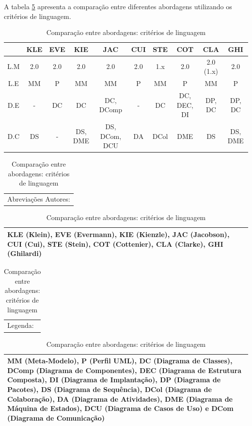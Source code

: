 A tabela \ref{tab:comparison_table_language} apresenta a comparação entre diferentes abordagens utilizando os critérios de linguagem.

\begin{table}[h]
	\centering
	\begin{tabular}{ | c | c | c | c | c | c | c | c | c | c | }
		\hline
		 & KLE & EVE & KIE & JAC & CUI & STE & COT & CLA & GHI \\
		\hline
		 L.M & 2.0 & 2.0 & 2.0 & 2.0 & 2.0 & 1.x & 2.0 & 2.0 (1.x) & 2.0 \\
		\hline
		 L.E & MM & P & MM & MM & P & MM & P & MM & P \\
		\hline
		 D.E & - & DC & DC & DC, DComp & - & DC & DC, DEC, DI & DP, DC & DP, DC\\
		\hline
		 D.C & DS & - & DS, DME & DS, DCom, DCU & DA & DCol & DME & DS & DS, DME \\
		\hline
	\end{tabular}
	
	\hspace{2em}

	\begin{tabular}{  p{16.6cm}  }
		Abreviações Autores: \\
	\end{tabular}
	
	\begin{tabular}{ | p{16.6cm} | }
		\hline
		KLE (Klein), EVE (Evermann), KIE (Kienzle), JAC (Jacobson), CUI (Cui), STE (Stein), COT (Cottenier), CLA (Clarke), GHI (Ghilardi) \\
		\hline
	\end{tabular}
	
	\begin{tabular}{  p{16.6cm}  }
		Legenda: \\
	\end{tabular}

	\begin{tabular}{ | p{16.6cm} | }
		\hline
		MM (Meta-Modelo), P (Perfil UML), DC (Diagrama de Classes), DComp (Diagrama de Componentes), DEC (Diagrama de Estrutura Composta), DI
		(Diagrama de Implantação), DP (Diagrama de Pacotes), DS (Diagrama de Sequência), DCol (Diagrama de Colaboração), DA (Diagrama de Atividades), 
		DME (Diagrama de Máquina de Estados), DCU (Diagrama de Casos de Uso) e DCom (Diagrama de Comunicação)\\
		\hline
	\end{tabular}
	\caption{Comparação entre abordagens: critérios de linguagem}
	\label{tab:comparison_table_language}
\end{table} 

